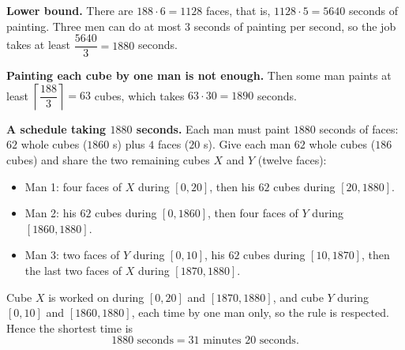 \textbf{Lower bound.} There are $188\cdot6=1128$ faces, that is, $1128\cdot5=5640$ seconds of painting. Three men can do at most $3$ seconds of painting per second, so the job takes at least $\dfrac{5640}{3}=1880$ seconds.

\textbf{Painting each cube by one man is not enough.} Then some man paints at least $\left\lceil\dfrac{188}{3}\right\rceil=63$ cubes, which takes $63\cdot30=1890$ seconds.

\textbf{A schedule taking $1880$ seconds.} Each man must paint $1880$ seconds of faces: $62$ whole cubes ($1860$ s) plus $4$ faces ($20$ s). Give each man $62$ whole cubes ($186$ cubes) and share the two remaining cubes $X$ and $Y$ (twelve faces):
\begin{itemize}
\item Man 1: four faces of $X$ during $[0,20]$, then his $62$ cubes during $[20,1880]$.
\item Man 2: his $62$ cubes during $[0,1860]$, then four faces of $Y$ during $[1860,1880]$.
\item Man 3: two faces of $Y$ during $[0,10]$, his $62$ cubes during $[10,1870]$, then the last two faces of $X$ during $[1870,1880]$.
\end{itemize}
Cube $X$ is worked on during $[0,20]$ and $[1870,1880]$, and cube $Y$ during $[0,10]$ and $[1860,1880]$, each time by one man only, so the rule is respected. Hence the shortest time is
\[
\boxed{1880\text{ seconds}}=31\text{ minutes }20\text{ seconds}.
\]
